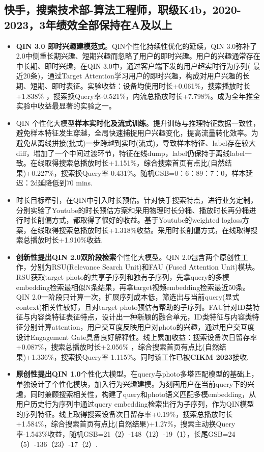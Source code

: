 \documentclass[11pt,a4paper]{moderncv}
\begin{document}
\subsection{快手，搜索技术部-算法工程师，职级K4b，2020-2023，3年绩效全部保持在A及以上}
{
\begin{itemize}
\item \textbf{QIN 3.0 即时兴趣建模范式}。QIN个性化持续性优化的延续，QIN 3.0弥补了2.0中侧重长期兴趣、短期兴趣而忽略了用户的即时兴趣。用户的兴趣通常存在中长期、即时兴趣，在QIN 3.0中，通过客户端下发的用户超实时行为序列( 最近20条)，通过Target Attention学习用户的即时兴趣，构成对用户兴趣的长期、短期、即时表征。实验收益：设备均使用时长+0.061\%，搜索播放时长+1.838\% ，搜索换Query率-0.521\%，内流总播放时长+7.798\%。成为全年推全实验中收益最显著的实验之一。
\item QIN 个性化大模型\textbf{样本实时化及流式训练}。提升训练与推理特征数据一致性，避免样本特征发生穿越，全局快速捕捉用户兴趣变化，提高流量转化效率。为避免从离线拼接(批式)一步跨越到实时(流式)，导致样本特征、label存在较大diff，增加了一个中间过渡环节，特征在线dump，label仍保持于离线label一致。在线取得搜索总播放时长+1.151\%，综合搜索首页有点比(自然结果)+0.227\%，搜索换Query率-0.431\%。随机GSB=0：6：89：7：0，样本延迟：2d延降低到70 mins.
\item 时长目标牵引，在QIN中引入时长预估。针对快手搜索特点，进行业务定制，分别实验了Youtube的时长预估方案和采用物理时长分桶、播放时长再分桶进行时长削偏方式，都取得了很好的收益。基于Youtube的weighted logloss方案，在线取得搜索总播放时长+1.318\%收益。采用时长削偏方式，在线取得搜索总播放时长+1.910\%收益.
\item \textbf{创新性提出QIN 2.0双阶段检索}个性化大模型。QIN 2.0包含两个原创性工作，分别为RSU(Relevance Search Unit)和FAU (Fused Attention Unit)模块。RSU获取target photo的共享子序列和独有子序列，先拿query的多模embedding检索最相似N条结果，再拿target视频embedding检索最近50条。QIN 2.0一阶段只计算一次，扩展序列成本低，筛选出与当前query(显式context)相关性较好，且对target photo预估有帮助的子序列。FAU针对ID类特征与内容类特征表征特点，设计出一种新颖的融合单元，ID类特征与内容类特征分别计算attention，用户交互度反映用户对photo的兴趣，通过用户交互度设计Engagement Gate具备良好解释性。线上累加收益：搜索设备次日留存率+0.087\%，搜索总播放时长+2.056\% ，综合搜索首页有点比(自然结果)+1.336\%，搜索换Query率-1.115\%。同时该工作已被\textbf{CIKM 2023}接收.
\item \textbf{原创性提出QIN 1.0}个性化大模型。在query与photo多塔匹配模型的基础上，单独设计了个性化模块，加入行为兴趣建模。为刻画用户在当前query下的兴趣，同时兼顾搜索相关性，构建了query和photo语义匹配多模embedding，从用户历史行为序列中通过query embedding检索出行为子序列，作为QIN模型的序列特征。线上取得搜索设备次日留存率+0.19\%，搜索总播放时长+1.584\%，综合搜索首页有点比(自然结果)+1.27\%，搜索主动换Query率-1.543\%收益，随机GSB=21（2）-148（12）-19（1），长尾GSB=24（5）-136（23）-17（2）.

\end{itemize}}
\end{document}

